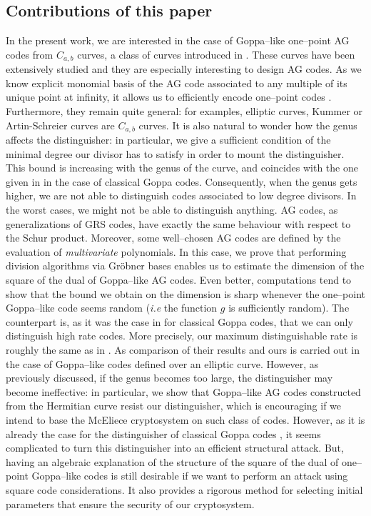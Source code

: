 \documentclass[a4paper]{amsart}
\theoremstyle{definition}
\theoremstyle{remark}
\begin{document}
\subsection*{Contributions of this paper}
In the present work, we are interested in the case of Goppa--like one--point AG codes from $C_{a,b}$ curves, a class of curves introduced in \cite{Miu93}. These curves have been extensively studied and they are especially interesting to design AG codes. As we know explicit monomial basis of the AG code associated to any multiple of its unique point at infinity, it allows us to efficiently encode one--point codes \cite{BRS21}. Furthermore, they remain quite general: for examples, elliptic curves, Kummer or Artin-Schreier curves are $C_{a,b}$ curves. It is also natural to wonder how the genus affects the distinguisher: in particular, we give a sufficient condition of the minimal degree our divisor has to satisfy in order to mount the distinguisher. This bound is increasing with the genus of the curve, and coincides with the one given in \cite{MT21} in the case of classical Goppa codes. Consequently, when the genus gets higher, we are not able to distinguish codes associated to low degree divisors. In the worst cases, we might not be able to distinguish anything.
AG codes, as generalizations of GRS codes, have exactly the same behaviour with respect to the Schur product. Moreover, some well--chosen AG codes are defined by the evaluation of \textit{multivariate} polynomials. In this case, we prove that performing division algorithms via Gr\"obner bases enables us to estimate the dimension of the square of the dual of Goppa--like AG codes. Even better, computations tend to show that the bound we obtain on the dimension is sharp whenever the one--point Goppa--like code seems random (\emph{i.e} the function $g$ is sufficiently random). The counterpart is, as it was the case in \cite{MT21} for classical Goppa codes, that we can only distinguish high rate codes. More precisely, our maximum distinguishable rate is roughly the same as in \cite{MT21}. As comparison of their results and ours is carried out in the case of Goppa--like codes defined over an elliptic curve. However, as previously discussed, if the genus becomes too large, the distinguisher may become ineffective: in particular, we show that Goppa--like AG codes constructed from the Hermitian curve resist our distinguisher, which is encouraging if we intend to base the McEliece cryptosystem on such class of codes.
However, as it is already the case for the distinguisher of classical Goppa codes \cite{MT21}, it seems complicated to turn this distinguisher into an efficient structural attack. But, having an algebraic explanation of the structure of the square of the dual of one--point Goppa--like codes is still desirable if we want to perform an attack using square code considerations. It also provides a rigorous method for selecting initial parameters that ensure the security of our cryptosystem.
\end{document}
